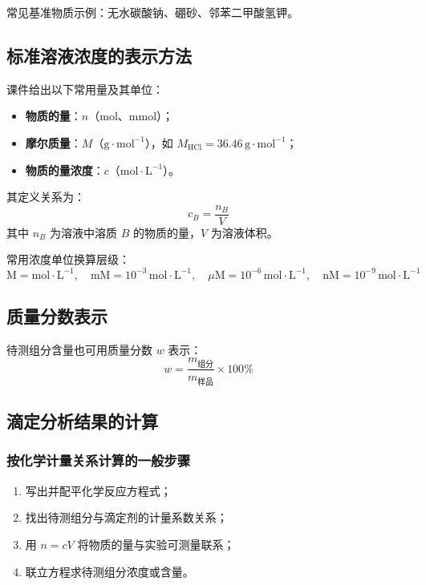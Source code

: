\documentclass[12pt,a4paper]{article}
\numberwithin{equation}{section}
\begin{document}
常见基准物质示例：无水碳酸钠、硼砂、邻苯二甲酸氢钾。

\subsection{标准溶液浓度的表示方法}

课件给出以下常用量及其单位：
\begin{itemize}
    \item \textbf{物质的量}：$n$（$\mathrm{mol}$、$\mathrm{mmol}$）；
    \item \textbf{摩尔质量}：$M$（$\mathrm{g\cdot mol^{-1}}$），如 $M_{\mathrm{HCl}}=36.46\,\mathrm{g\cdot mol^{-1}}$；
    \item \textbf{物质的量浓度}：$c$（$\mathrm{mol\cdot L^{-1}}$）。
\end{itemize}

其定义关系为：
\begin{equation}
c_B=\frac{n_B}{V}
\end{equation}
其中 $n_B$ 为溶液中溶质 $B$ 的物质的量，$V$ 为溶液体积。

常用浓度单位换算层级：
\begin{equation}
\mathrm{M}=\mathrm{mol\cdot L^{-1}},\quad
\mathrm{mM}=10^{-3}\,\mathrm{mol\cdot L^{-1}},\quad
\mu\mathrm{M}=10^{-6}\,\mathrm{mol\cdot L^{-1}},\quad
\mathrm{nM}=10^{-9}\,\mathrm{mol\cdot L^{-1}}
\end{equation}

\subsection{质量分数表示}
待测组分含量也可用质量分数 $w$ 表示：
\begin{equation}
w=\frac{m_{\text{组分}}}{m_{\text{样品}}}\times 100\%
\end{equation}

\subsection{滴定分析结果的计算}

\subsubsection{按化学计量关系计算的一般步骤}
\begin{enumerate}
    \item 写出并配平化学反应方程式；
    \item 找出待测组分与滴定剂的计量系数关系；
    \item 用 $n=cV$ 将物质的量与实验可测量联系；
    \item 联立方程求待测组分浓度或含量。
\end{enumerate}
\end{document}
